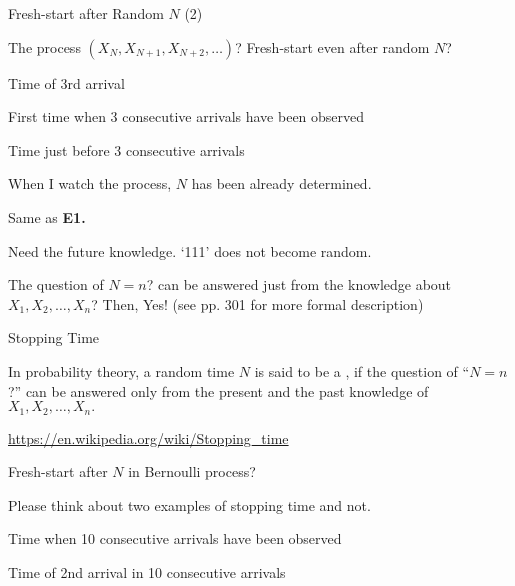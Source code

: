 \begin{frame}{Fresh-start after Random $N$ (2)}


 The process $(X_{N},X_{N+1}, X_{N+2}, \ldots)$? Fresh-start even after random $N$?

\medskip
{}
{
\small
\bce[\bf E1.]
\item Time of 3rd arrival
\item First time when 3 consecutive arrivals have been observed
\item Time just before 3 consecutive arrivals
\ece
}
{
\vspace{-0.5cm}
\centering
{}
}


\plitemsep 0.05in
\bci

\item<2->[\bf E1.] When I watch the process, $N$ has been already determined. 
\item<3->[\bf E2.] Same as {\bf E1.} 
\item<4->[\bf E3.] Need the future knowledge. `111' does not become random.  

\medskip
\item<5-> The question of $N=n$? can be answered just from the knowledge about $X_1, X_2, \ldots, X_n$? Then, Yes! (see pp. 301 for more formal description)

\eci
\end{frame}

\begin{frame}{Stopping Time}


\plitemsep 0.1in
\bci

\item<2-> In probability theory, a random time $N$ is said to be a
  , if the question of ``$N=n$?'' can be answered
  only from the present and the past knowledge of $X_1, X_2, \ldots, X_n.$ 

\item<3-> \url{https://en.wikipedia.org/wiki/Stopping_time}

\item<4-> Fresh-start after $N$ in Bernoulli process? 

\item<5-> Please think about two examples of stopping time and not. \hfill
  \bci
  
\item<6->  Time when 10 consecutive arrivals have been observed
\item<7->  Time of 2nd arrival in 10 consecutive arrivals
  \eci
  
  \eci
\end{frame}

